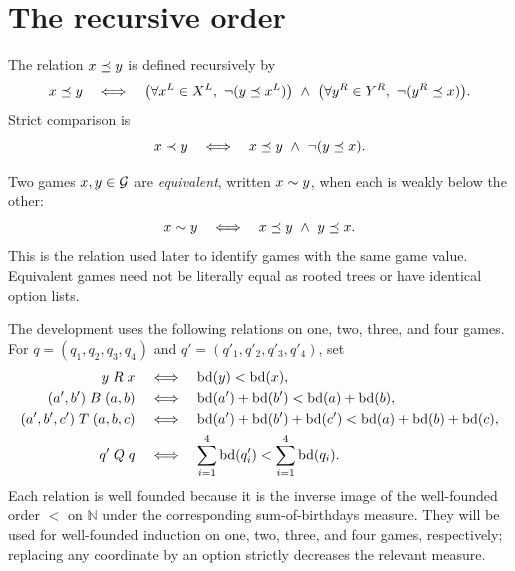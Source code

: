 \section{The recursive order}

\begin{definition}
  \label{def:game-order}
  \leanok
  The relation \(x\preceq y\) is defined recursively by
  \[
    x\preceq y
    \quad\Longleftrightarrow\quad
    \bigl(\forall x^L\in X^L,\ \neg(y\preceq x^L)\bigr)
    \ \wedge\
    \bigl(\forall y^R\in Y^R,\ \neg(y^R\preceq x)\bigr).
  \]
  Strict comparison is
  \[
    x\prec y \quad\Longleftrightarrow\quad
    x\preceq y\ \wedge\ \neg(y\preceq x).
  \]
\end{definition}

\begin{definition}
  \label{def:game-equivalence}
  \leanok
  Two games \(x,y\in\mathcal{G}\) are \emph{equivalent}, written \(x\sim y\), when each is
  weakly below the other:
  \[
    x\sim y \quad\Longleftrightarrow\quad
    x\preceq y\ \wedge\ y\preceq x.
  \]
  This is the relation used later to identify games with the same game value.  Equivalent games
  need not be literally equal as rooted trees or have identical option lists.
\end{definition}

\begin{definition}
  \label{def:game-inductions}
  \leanok
  The development uses the following relations on one, two, three, and four games.  For
  \(q=(q_1,q_2,q_3,q_4)\) and \(q'=(q'_1,q'_2,q'_3,q'_4)\), set
  \[
    \begin{aligned}
      y\mathrel R x
        &\quad\Longleftrightarrow\quad \operatorname{bd}(y)<\operatorname{bd}(x),\\
      (a',b')\mathrel B(a,b)
        &\quad\Longleftrightarrow\quad
          \operatorname{bd}(a')+\operatorname{bd}(b')<\operatorname{bd}(a)+\operatorname{bd}(b),\\
      (a',b',c')\mathrel T(a,b,c)
        &\quad\Longleftrightarrow\quad
          \operatorname{bd}(a')+\operatorname{bd}(b')+\operatorname{bd}(c')<\operatorname{bd}(a)+\operatorname{bd}(b)+\operatorname{bd}(c),\\
      q'\mathrel Qq
        &\quad\Longleftrightarrow\quad
          \sum_{i=1}^{4}\operatorname{bd}(q'_i)<\sum_{i=1}^{4}\operatorname{bd}(q_i).
    \end{aligned}
  \]
  Each relation is well founded because it is the inverse image of the well-founded order
  \(<\) on \(\mathbb N\) under the corresponding sum-of-birthdays measure.  They will be used
  for well-founded induction on one, two, three, and four games, respectively; replacing any
  coordinate by an option strictly decreases the relevant measure.
\end{definition}

